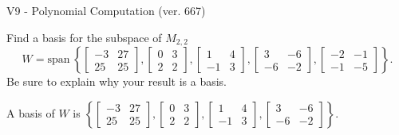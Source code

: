 \begin{exercise}
  \begin{exerciseTitle}V9 - Polynomial Computation (ver. 667)\end{exerciseTitle}
  \begin{exerciseStatement}
    Find a basis for the subspace of \(M_{2,2}\) 
\[W=\mathrm{span}\ \left\{\left[\begin{array}{cc}
-3 & 27 \\
25 & 25
\end{array}\right] , \left[\begin{array}{cc}
0 & 3 \\
2 & 2
\end{array}\right] , \left[\begin{array}{cc}
1 & 4 \\
-1 & 3
\end{array}\right] , \left[\begin{array}{cc}
3 & -6 \\
-6 & -2
\end{array}\right] , \left[\begin{array}{cc}
-2 & -1 \\
-1 & -5
\end{array}\right]\right\}.\]
 Be sure to explain why your result is a basis.


  \end{exerciseStatement}
  \begin{exerciseAnswer}
   A basis of \(W\) is  \(\left\{\left[\begin{array}{cc}
-3 & 27 \\
25 & 25
\end{array}\right] , \left[\begin{array}{cc}
0 & 3 \\
2 & 2
\end{array}\right] , \left[\begin{array}{cc}
1 & 4 \\
-1 & 3
\end{array}\right] , \left[\begin{array}{cc}
3 & -6 \\
-6 & -2
\end{array}\right]\right\}\).
  


  \end{exerciseAnswer}
\end{exercise}